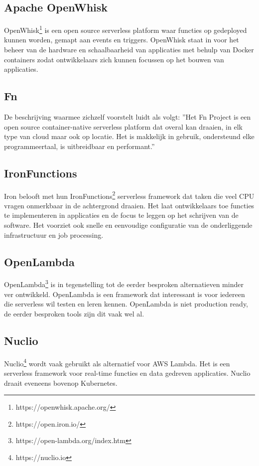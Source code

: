 \subsection{Apache OpenWhisk}
OpenWhisk\footnote{https://openwhisk.apache.org/} is een open source serverless platform waar functies op gedeployed kunnen worden, gemapt aan events en triggers. OpenWhisk staat in voor het beheer van de hardware en schaalbaarheid van applicaties met behulp van Docker containers zodat ontwikkelaars zich kunnen focussen op het bouwen van applicaties.

\subsection{Fn}
De beschrijving waarmee \textcite{FnProject2019} zichzelf voorstelt luidt als volgt: ''Het Fn Project is een open source container-native serverless platform dat overal kan draaien, in elk type van cloud maar ook op locatie. Het is makkelijk in gebruik, ondersteund elke programmeertaal, is uitbreidbaar en performant.''

\subsection{IronFunctions}
Iron belooft met hun IronFunctions\footnote{https://open.iron.io/} serverless framework dat taken die veel CPU vragen onmerkbaar in de achtergrond draaien. Het laat ontwikkelaars toe functies te implementeren in applicaties en de focus te leggen op het schrijven van de software. Het voorziet ook snelle en eenvoudige configuratie van de onderliggende infrastructuur en job processing.

\subsection{OpenLambda}
OpenLambda\footnote{https://open-lambda.org/index.htm} is in tegenstelling tot de eerder besproken alternatieven minder ver ontwikkeld. OpenLambda is een framework dat interessant is voor iedereen die serverless wil testen en leren kennen. OpenLambda is niet production ready, de eerder besproken tools zijn dit vaak wel al.

\subsection{Nuclio}
Nuclio\footnote{https://nuclio.io} wordt vaak gebruikt als alternatief voor AWS Lambda. Het is een serverless framework voor real-time functies en data gedreven applicaties. Nuclio draait eveneens bovenop Kubernetes.

